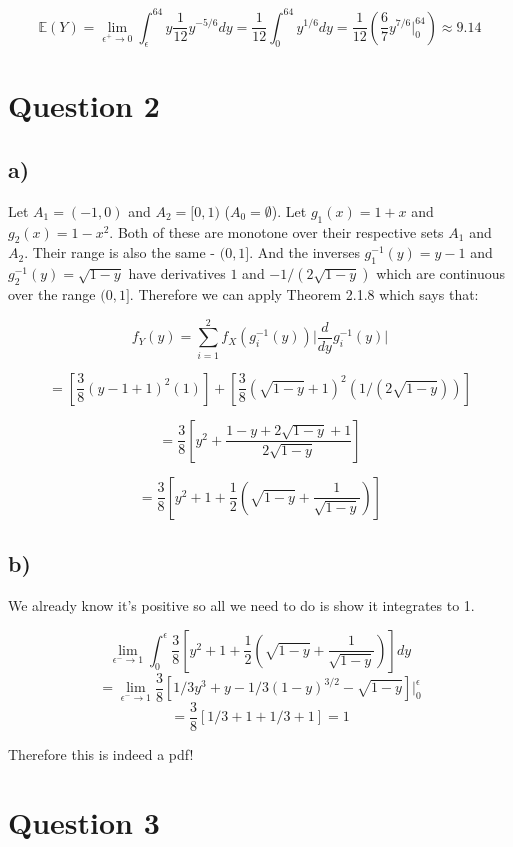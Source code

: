 \documentclass[11pt]{article}
\begin{document}
$$\mathbb{E}(Y) = \lim_{\epsilon^+ \rightarrow 0} \int_{\epsilon}^{64} y \frac{1}{12}y^{-5/6}dy=\frac{1}{12}\int_0^{64}y^{1/6}dy =\frac{1}{12}\left(\frac{6}{7}y^{7/6} \Big|_0^{64} \right) \approx 9.14$$

\section*{Question 2}

\subsection*{a)}

Let $A_1=(-1, 0)$ and $A_2=[0, 1)$ ($A_0=\emptyset$). Let $g_1(x) = 1 + x$ and $g_2(x) = 1 - x^2$. Both of these are monotone over their respective sets $A_1$ and $A_2$. Their range is also the same - $(0, 1]$. And the inverses $g_1^{-1}(y)=y-1$ and $g_2^{-1}(y)=\sqrt{1-y}$ have derivatives $1$ and $-1/(2\sqrt{1-y})$ which are continuous over the range $(0, 1]$. Therefore we can apply Theorem 2.1.8 which says that:

$$f_Y(y)=\sum_{i=1}^2 f_X\left(g_i^{-1}(y)\right)\Big| \frac{d}{dy}g_i^{-1}(y) \Big|$$

$$=\left[ \frac{3}{8}(y-1+1)^2(1)\right]+\left[ \frac{3}{8}(\sqrt{1-y}+1)^2\left( 1/(2\sqrt{1-y})\right) \right]$$

$$=\frac{3}{8}\left[ y^2 +\frac{1-y+2\sqrt{1-y}+1}{2\sqrt{1-y}}\right]$$

$$=\frac{3}{8}\left[ y^2 + 1 +\frac{1}{2}\left(\sqrt{1-y}+\frac{1}{\sqrt{1-y}}\right)\right]$$

\subsection*{b)}

We already know it's positive so all we need to do is show it integrates to 1. 

$$\lim_{\epsilon^- \rightarrow 1} \int_{0}^{\epsilon} \frac{3}{8}\left[ y^2 + 1 +\frac{1}{2}\left(\sqrt{1-y}+\frac{1}{\sqrt{1-y}}\right)\right] dy$$
$$=\lim_{\epsilon^- \rightarrow 1}\frac{3}{8}\left[1/3y^3 + y - 1/3(1-y)^{3/2} - \sqrt{1-y} \right] \Big|_{0}^{\epsilon}$$
$$=\frac{3}{8} \left[1/3 + 1 + 1/3 + 1 \right]=1$$

Therefore this is indeed a pdf!

\section*{Question 3}
\end{document}
